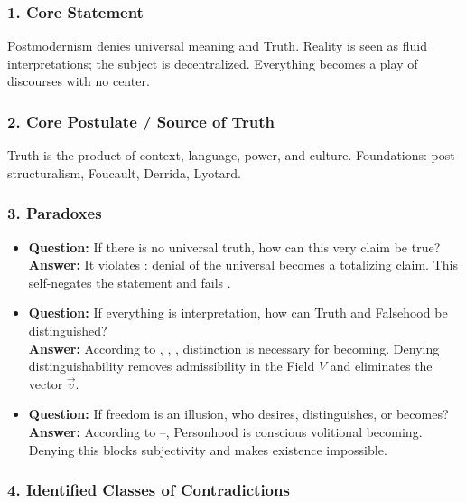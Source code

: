 \documentclass[12pt]{article}
\begin{document}
\subsubsection*{1. Core Statement}

Postmodernism denies universal meaning and Truth. Reality is seen as fluid interpretations; the subject is decentralized. Everything becomes a play of discourses with no center.

\subsubsection*{2. Core Postulate / Source of Truth}

Truth is the product of context, language, power, and culture. Foundations: post-structuralism, Foucault, Derrida, Lyotard.

\subsubsection*{3. Paradoxes}

\begin{itemize}
\item \textbf{Question:} If there is no universal truth, how can this very claim be true?  
\\ \textbf{Answer:} It violates \text{[2]}: denial of the universal becomes a totalizing claim. This self-negates the statement and fails \text{[11.1.1.2]}.

\item \textbf{Question:} If everything is interpretation, how can Truth and Falsehood be distinguished?  
\\ \textbf{Answer:} According to \text{[1]}, \text{[3]}, \text{[4.1]}, distinction is necessary for becoming. Denying distinguishability removes admissibility in the Field $V$ and eliminates the vector $\vec{v}$.

\item \textbf{Question:} If freedom is an illusion, who desires, distinguishes, or becomes?  
\\ \textbf{Answer:} According to \text{[12.1]}–\text{[12.3]}, Personhood is conscious volitional becoming. Denying this blocks subjectivity and makes existence impossible.
\end{itemize}

\subsubsection*{4. Identified Classes of Contradictions}
\end{document}
